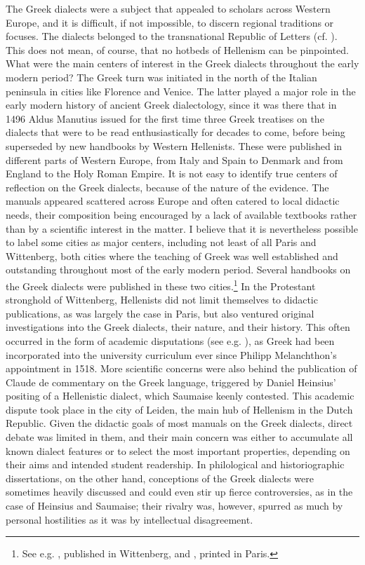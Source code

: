 The Greek dialects were a subject that appealed to scholars across Western Europe, and it is difficult, if not impossible, to discern regional traditions or focuses. The dialects belonged to the transnational Republic of Letters (cf. \citealt{BotsWaquet1997}). This does not mean, of course, that no hotbeds of Hellenism can be pinpointed. What were the main centers of interest in the Greek dialects throughout the early modern period? The Greek turn was initiated in the north of the Italian peninsula in cities like Florence and Venice. The latter played a major role in the early modern history of ancient Greek dialectology, since it was there that in 1496 Aldus Manutius issued for the first time three Greek treatises on the dialects that were to be read enthusiastically for decades to come, before being superseded by new handbooks by Western Hellenists. These were published in different parts of Western Europe, from Italy and Spain to Denmark and from England to the Holy Roman Empire. It is not easy to identify true centers of reflection on the Greek dialects, because of the nature of the evidence. The manuals appeared scattered across Europe and often catered to local didactic needs, their composition being encouraged by a lack of available textbooks rather than by a scientific interest in the matter. I believe that it is nevertheless possible to label some cities as major centers, including not least of all Paris and Wittenberg, both cities where the teaching of Greek was well established and outstanding throughout most of the early modern period. Several handbooks on the Greek dialects were published in these two cities.\footnote{See e.g. \citet{Schmidt1604}, published in Wittenberg, and \citet{Mérigon1621}, printed in Paris.} In the Protestant stronghold of Wittenberg, Hellenists did not limit themselves to didactic publications, as was largely the case in Paris, but also ventured original investigations into the Greek dialects, their nature, and their history. This often occurred in the form of academic disputations (see e.g. \citealt{Thryllitsch1709}), as Greek had been incorporated into the university curriculum ever since Philipp Melanchthon’s appointment in 1518. More scientific concerns were also behind the publication of Claude de  commentary on the Greek language, triggered by Daniel Heinsius’ positing of a Hellenistic dialect, which Saumaise keenly contested. This academic dispute took place in the city of Leiden, the main hub of Hellenism in the Dutch Republic. Given the didactic goals of most manuals on the Greek dialects, direct debate was limited in them, and their main concern was either to accumulate all known dialect features or to select the most important properties, depending on their aims and intended student readership. In philological and historiographic dissertations, on the other hand, conceptions of the Greek dialects were sometimes heavily discussed and could even stir up fierce controversies, as in the case of Heinsius and Saumaise; their rivalry was, however, spurred as much by personal hostilities as it was by intellectual disagreement.

